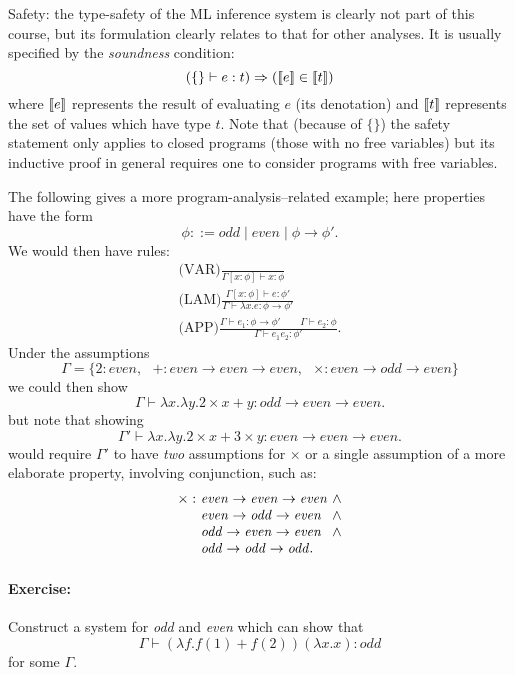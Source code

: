 \documentclass[twoside,a4paper,11pt]{article}
\newcommand{\db}[1]{{\bf [\![}#1{\bf ]\!]}}
\begin{document}
Safety: the type-safety of the ML inference system is clearly not part of
this course, but its formulation clearly relates to that for other analyses.
It is usually specified by the {\em soundness} condition:
\[ (\{\} \vdash e:t) \Rightarrow (\db{e} \in \db{t}) \]
where $\db{e}$ represents the result of evaluating $e$ (its denotation)
and $\db{t}$ represents the set of values which have type $t$.
Note that (because of $\{\}$) the safety statement only applies to closed
programs (those with no free variables) but its inductive proof in general
requires one to consider programs with free variables.

The following gives a more program-analysis--related example;
here properties have the form
\[ \phi ::= \mathit{odd} \mid \mathit{even} \mid \phi \rightarrow \phi'. \]
We would then have rules:
\[ \begin{array}{c}
\displaystyle\mbox{(VAR)}\frac{}{\Gamma[x:\phi] \vdash x:\phi} \\[3ex]
\displaystyle\mbox{(LAM)}\frac{\Gamma[x:\phi] \vdash e:\phi'}
                     {\Gamma \vdash \lambda x.e:\phi\rightarrow \phi'} \\[3ex]
\displaystyle\mbox{(APP)}\frac{\Gamma \vdash e_1:\phi\rightarrow \phi'
                  \hspace{2em} \Gamma \vdash e_2:\phi}
                     {\Gamma \vdash e_1 e_2:\phi'}.
\end{array} \]
Under the assumptions
\[ \Gamma = \{2:\mathit{even},~~~
+:\mathit{even} \rightarrow \mathit{even} \rightarrow \mathit{even},~~~
\times:\mathit{even} \rightarrow \mathit{odd} \rightarrow \mathit{even}
 \} \]
we could then show
\[ \Gamma \vdash \lambda x.\lambda y. 2\times x+y:
    \mathit{odd} \rightarrow \mathit{even} \rightarrow \mathit{even}.
\]
but note that showing
\[ \Gamma' \vdash \lambda x.\lambda y. 2\times x+3\times y:
    \mathit{even} \rightarrow \mathit{even} \rightarrow \mathit{even}.
\]
would require $\Gamma'$ to have {\em two} assumptions for $\times$
or a single assumption of a
more elaborate property, involving conjunction, such as:
\[
\begin{array}{r@{}l@{}l}
\times :~
&  \mathit{even} \rightarrow \mathit{even} \rightarrow \mathit{even} &~\wedge\\
&  \mathit{even} \rightarrow \mathit{odd} \rightarrow \mathit{even} &~\wedge\\
&  \mathit{odd} \rightarrow \mathit{even} \rightarrow \mathit{even} &~\wedge\\
&  \mathit{odd} \rightarrow \mathit{odd} \rightarrow \mathit{odd}.
\end{array} \]
\paragraph{Exercise:}
Construct a system for {\em odd} and {\em even} which can show that
\[ \Gamma \vdash (\lambda f.f(1)+f(2))(\lambda x.x) : \mathit{odd} \]
for some $\Gamma$.
\end{document}
